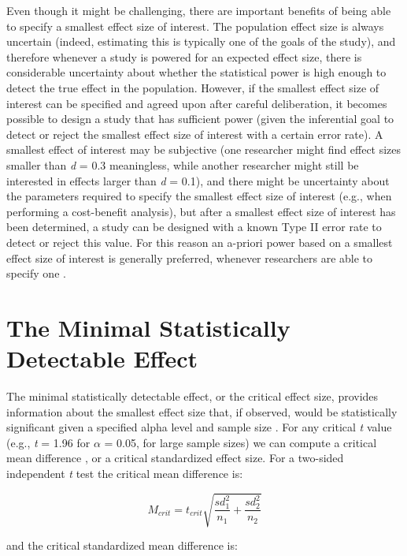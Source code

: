 \documentclass[
  oneside]{book}
\begin{document}
Even though it might be challenging, there are important benefits of being able to specify a smallest effect size of interest. The population effect size is always uncertain (indeed, estimating this is typically one of the goals of the study), and therefore whenever a study is powered for an expected effect size, there is considerable uncertainty about whether the statistical power is high enough to detect the true effect in the population. However, if the smallest effect size of interest can be specified and agreed upon after careful deliberation, it becomes possible to design a study that has sufficient power (given the inferential goal to detect or reject the smallest effect size of interest with a certain error rate). A smallest effect of interest may be subjective (one researcher might find effect sizes smaller than \emph{d} = 0.3 meaningless, while another researcher might still be interested in effects larger than \emph{d} = 0.1), and there might be uncertainty about the parameters required to specify the smallest effect size of interest (e.g., when performing a cost-benefit analysis), but after a smallest effect size of interest has been determined, a study can be designed with a known Type II error rate to detect or reject this value. For this reason an a-priori power based on a smallest effect size of interest is generally preferred, whenever researchers are able to specify one \citep{brown_errors_1983, aberson_applied_2019, albers_when_2018, cascio_open_1983, dienes_using_2014, lenth_practical_2001}.

\hypertarget{minimaldetectable}{%
\section{The Minimal Statistically Detectable Effect}\label{minimaldetectable}}

The minimal statistically detectable effect, or the critical effect size, provides information about the smallest effect size that, if observed, would be statistically significant given a specified alpha level and sample size \citep{cook_assessing_2014}. For any critical \emph{t} value (e.g., \emph{t} = 1.96 for \(\alpha\) = 0.05, for large sample sizes) we can compute a critical mean difference \citep{phillips_statistical_2001}, or a critical standardized effect size. For a two-sided independent \emph{t} test the critical mean difference is:

\[M_{crit} = t_{crit}{\sqrt{\frac{sd_1^2}{n_1} + \frac{sd_2^2}{n_2}}}\]

and the critical standardized mean difference is:
\end{document}
